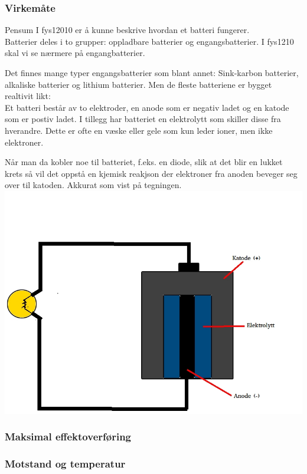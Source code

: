 \subsubsection{Virkemåte}
Pensum I fys12010 er å kunne beskrive hvordan et batteri fungerer.
\\

Batterier deles i to grupper: oppladbare batterier og engangsbatterier.
I fys1210 skal vi se nærmere på engangbatterier.

Det finnes mange typer engangsbatterier som blant annet:
Sink-karbon batterier, alkaliske batterier og lithium batterier.
Men de fleste batteriene er bygget realtivit likt:
\\

Et batteri består av to elektroder,
en anode som er negativ ladet og en katode som er postiv ladet.
I tillegg har batteriet en elektrolytt som skiller disse fra hverandre.
Dette er ofte en væske eller gele som kun leder ioner, men ikke elektroner.

Når man da kobler noe til batteriet, f.eks. en diode,
slik at det blir en lukket krets
så vil det oppstå en kjemisk reakjson
der elektroner fra anoden beveger seg over til katoden.
Akkurat som vist på tegningen.
\\
\includegraphics[width=\textwidth]{./img/batteri}

\subsubsection{Maksimal effektoverføring}


\subsubsection{Motstand og temperatur}

